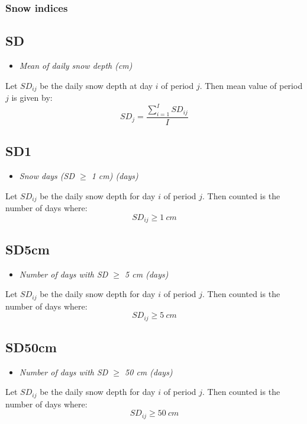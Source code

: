 \documentclass[a4paper,11pt]{article}
\begin{document}
\subsubsection{Snow indices}

\subsection*{SD}
\begin{itemize}
\item \textit{Mean of daily snow depth (cm)}
\end{itemize}
Let $SD_{ij}$ be the daily snow depth at day $i$ of period $j$. Then
mean value of period $j$ is given by:
\begin{equation*}
SD_j = \frac{\sum^{I}_{i=1}SD_{ij}}{I}
\end{equation*}

\subsection*{SD1}
\begin{itemize}
\item \textit{Snow days (SD $\geq$ 1 cm) (days)}
\end{itemize}
Let $SD_{ij}$ be the daily snow depth for day $i$ of period
$j$. Then counted is the number of days where:
\begin{equation*}
SD_{ij} \geq 1~cm
\end{equation*}

\subsection*{SD5cm}
\begin{itemize}
\item \textit{Number of days with SD $\geq$ 5 cm (days)}
\end{itemize}
Let $SD_{ij}$ be the daily snow depth for day $i$ of period
$j$. Then counted is the number of days where:
\begin{equation*}
SD_{ij} \geq 5~cm
\end{equation*}

\subsection*{SD50cm}
\begin{itemize}
\item \textit{Number of days with SD $\geq$ 50 cm (days)}
\end{itemize}
Let $SD_{ij}$ be the daily snow depth for day $i$ of period
$j$. Then counted is the number of days where:
\begin{equation*}
SD_{ij} \geq 50~cm
\end{equation*}
\end{document}
